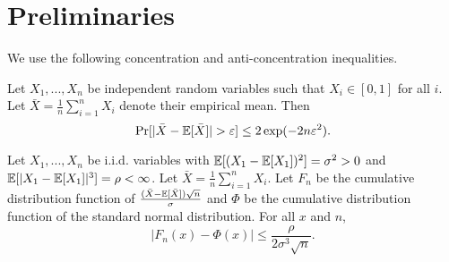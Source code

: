 \section{Preliminaries}
\label{sec:prelim}

We use the following  concentration and anti-concentration inequalities. 

\begin{theorem}
Let $X_1,...,X_n$  be independent random variables such that $X_i \in [0,1]$ for all $i$. Let $\bar{X} = \frac{1}{n}\sum_{i=1}^n X_i$ denote their empirical mean. Then
\[
\Pr[ |\bar{X} - \mathbb{E}[\bar{X}]| > \varepsilon] \leq 2\exp(-2n\varepsilon^2).
\]
\end{theorem}

\begin{theorem}
Let $X_1,...,X_n$ be i.i.d. variables with $\mathbb{E}[ (X_1 - \mathbb{E}[X_1])^2] = \sigma^2 >0$ and $\mathbb{E}[ |X_1 - \mathbb{E}[X_1]|^3] =\rho <\infty$. Let $\bar{X} = \frac{1}{n} \sum_{i=1}^n X_i$. Let $F_n$ be the cumulative distribution function of $\frac{(\bar{X} - \mathbb{E}[\bar{X}]) \sqrt{n}}{\sigma}$ and $\Phi$ be the cumulative distribution function of the standard normal distribution. For all $x$ and $n$,
\[
|F_n(x) - \Phi(x) | \leq \frac{\rho}{2\sigma^3\sqrt{n}}.
\]
\end{theorem}

